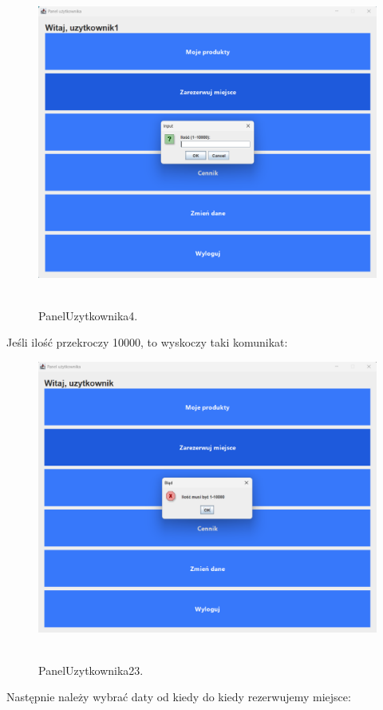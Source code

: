 \begin{figure}[H]
    \centering
    \includegraphics[width=.9\linewidth]{figures/Paneluzytkownika4.png}\
    \caption{PanelUzytkownika4.\label{PanelUzytkownika4}}
\end{figure}

Jeśli ilość przekroczy 10000, to wyskoczy taki komunikat:

\begin{figure}[H]
    \centering
    \includegraphics[width=.9\linewidth]{figures/PanelUzytkownika23.png}\
    \caption{PanelUzytkownika23.\label{PanelUzytkownika23}}
\end{figure}

Następnie należy wybrać daty od kiedy do kiedy rezerwujemy miejsce:

